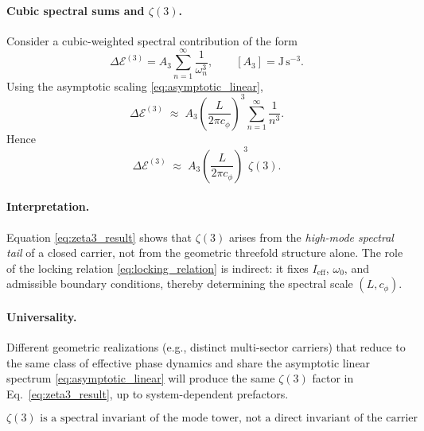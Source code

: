 \documentclass[11pt]{article}
\theoremstyle{definition}
\theoremstyle{plain}
\theoremstyle{remark}
\begin{document}
    \paragraph{Cubic spectral sums and \texorpdfstring{$\zeta(3)$}{zeta(3)}.}
        Consider a cubic-weighted spectral contribution of the form
        \begin{equation}
            \Delta \mathcal{E}^{(3)}
            =
            A_3 \sum_{n=1}^{\infty} \frac{1}{\omega_n^3},
            \qquad
            [A_3]=\mathrm{J\,s^{-3}}.
            \label{eq:cubic_sum}
        \end{equation}
        Using the asymptotic scaling \eqref{eq:asymptotic_linear},
        \begin{equation}
            \Delta \mathcal{E}^{(3)}
            \;\approx\;
            A_3
            \left(\frac{L}{2\pi c_\phi}\right)^3
            \sum_{n=1}^{\infty} \frac{1}{n^3}.
        \end{equation}
        Hence
        \begin{equation}
            \boxed{
                \Delta \mathcal{E}^{(3)}
                \;\approx\;
                A_3
                \left(\frac{L}{2\pi c_\phi}\right)^3
                \zeta(3).
            }
            \label{eq:zeta3_result}
        \end{equation}

    \paragraph{Interpretation.}
        Equation \eqref{eq:zeta3_result} shows that $\zeta(3)$ arises from the \emph{high-mode spectral tail} of a closed carrier, not from the geometric threefold structure alone. The role of the locking relation \eqref{eq:locking_relation} is indirect: it fixes $I_{\mathrm{eff}}$, $\omega_0$, and admissible boundary conditions, thereby determining the spectral scale $(L,c_\phi)$.

    \paragraph{Universality.}
        Different geometric realizations (e.g., distinct multi-sector carriers) that reduce to the same class of effective phase dynamics and share the asymptotic linear spectrum \eqref{eq:asymptotic_linear} will produce the same $\zeta(3)$ factor in Eq.~\eqref{eq:zeta3_result}, up to system-dependent prefactors.
        
        \begin{equation}
            \boxed{
                \text{$\zeta(3)$ is a spectral invariant of the mode tower, not a direct invariant of the carrier geometry.}
            }
        \end{equation}
\end{document}
